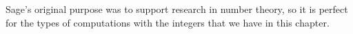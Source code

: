 Sage's original purpose was to support research in number theory, so it is perfect for the types of computations with the integers that we have in this chapter.